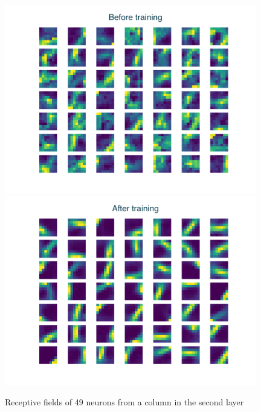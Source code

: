 \documentclass[12pt]{article}
\begin{document}
\begin{figure}[!htbp]
	\centering
	\includegraphics[width=11cm]{k5s2c1d1_k2s1c20d1_c49 machine before}
	\includegraphics[width=11cm]{k5s2c1d1_k2s1c20d1_c49 machine after}
	\caption{Receptive fields of 49 neurons from a column in the second layer}
	\label{fig:layer2}
\end{figure} 
\end{document}
